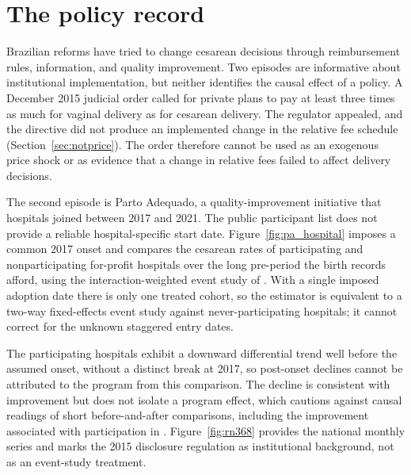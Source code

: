 




\section{The policy record}\label{app:policy}

Brazilian reforms have tried to change cesarean decisions through reimbursement
rules, information, and quality improvement. Two episodes are informative about
institutional implementation, but neither identifies the causal effect of a policy.
A December 2015 judicial order called for private plans to pay at least three
times as much for vaginal delivery as for cesarean delivery. The regulator
appealed, and the directive did not produce an implemented change in the relative
fee schedule (Section~\ref{sec:notprice}). The order therefore cannot be used as an
exogenous price shock or as evidence that a change in relative fees failed to
affect delivery decisions.

The second episode is Parto Adequado, a quality-improvement initiative that
hospitals joined between 2017 and 2021. The public participant list does not
provide a reliable hospital-specific start date. Figure~\ref{fig:pa_hospital}
imposes a common 2017 onset and compares the cesarean rates of participating and
nonparticipating for-profit hospitals over the long pre-period the birth records
afford, using the interaction-weighted event study of \citet{sun2021}. With a
single imposed adoption date there is only one treated cohort, so the estimator is
equivalent to a two-way fixed-effects event study against never-participating
hospitals; it cannot correct for the unknown staggered entry dates.

The participating hospitals exhibit a downward differential trend well before the
assumed onset, without a distinct break at 2017, so post-onset declines cannot be
attributed to the program from this comparison. The decline is consistent with
improvement but does not isolate a program effect, which cautions against causal
readings of short before-and-after comparisons, including the improvement
associated with participation in \citet{borem2020}.
Figure~\ref{fig:rn368} provides the national monthly series and marks the 2015
disclosure regulation as institutional background, not as an event-study
treatment.

